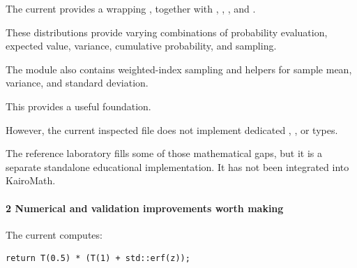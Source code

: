 \hypertarget{02-foundations-ii-ch039-existing-probability-api}{}

The current  provides a  wrapping , together with , , , and .

These distributions provide varying combinations of probability evaluation, expected value, variance, cumulative probability, and sampling.

The module also contains weighted-index sampling and helpers for sample mean, variance, and standard deviation.

This provides a useful foundation.

However, the current inspected file does not implement dedicated , , or  types.

The reference laboratory fills some of those mathematical gaps, but it is a separate standalone educational implementation. It has not been integrated into KairoMath.

\paragraph{2 Numerical and validation improvements worth making}\label{02-foundations-ii-ch039-numerical-and-validation-improvements-worth-making}

\hypertarget{02-foundations-ii-ch039-numerical-and-validation-improvements-worth-making}{}

The current  computes:

\begin{verbatim}
return T(0.5) * (T(1) + std::erf(z));
\end{verbatim}

